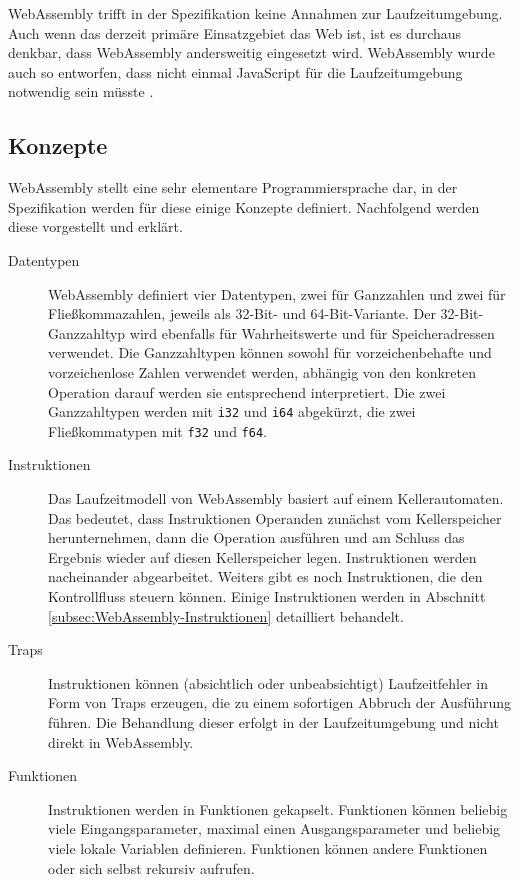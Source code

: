 WebAssembly trifft in der Spezifikation keine Annahmen zur Laufzeitumgebung. Auch wenn das derzeit primäre Einsatzgebiet das Web ist, ist es durchaus denkbar, dass WebAssembly andersweitig eingesetzt wird. WebAssembly wurde auch so entworfen, dass nicht einmal JavaScript für die Laufzeitumgebung notwendig sein müsste \cite{WebAssemblyWebsite}.

\subsection{Konzepte}
\label{subsec:WebAssembly-Konzepte}
WebAssembly stellt eine sehr elementare Programmiersprache dar, in der Spezifikation werden für diese einige Konzepte \cite{WebAssemblySpecification} definiert. Nachfolgend werden diese vorgestellt und erklärt.

\begin{description}
    \item[Datentypen] WebAssembly definiert vier Datentypen, zwei für Ganzzahlen und zwei für Fließkommazahlen, jeweils als 32-Bit- und 64-Bit-Variante. Der 32-Bit-Ganz\-zahl\-typ wird ebenfalls für Wahrheitswerte und für Speicheradressen verwendet. Die Ganzzahltypen können sowohl für vorzeichenbehafte und vorzeichenlose Zahlen verwendet werden, abhängig von den konkreten Operation darauf werden sie entsprechend interpretiert. Die zwei Ganzzahltypen werden mit \lstinline{i32} und \lstinline{i64} abgekürzt, die zwei Fließkommatypen mit \lstinline{f32} und \lstinline{f64}.
    \item[Instruktionen] Das Laufzeitmodell von WebAssembly basiert auf einem Kellerautomaten. Das bedeutet, dass Instruktionen Operanden zunächst vom Kellerspeicher herunternehmen, dann die Operation ausführen und am Schluss das Ergebnis wieder auf diesen Kellerspeicher legen. Instruktionen werden nacheinander abgearbeitet. Weiters gibt es noch Instruktionen, die den Kontrollfluss steuern können. Einige Instruktionen werden in Abschnitt \ref{subsec:WebAssembly-Instruktionen} detailliert behandelt.
    \item[Traps] Instruktionen können (absichtlich oder unbeabsichtigt) Laufzeitfehler in Form von Traps erzeugen, die zu einem sofortigen Abbruch der Ausführung führen. Die Behandlung dieser erfolgt in der Laufzeitumgebung und nicht direkt in WebAssembly.
    \item[Funktionen] Instruktionen werden in Funktionen gekapselt. Funktionen können beliebig viele Eingangsparameter, maximal einen Ausgangsparameter und beliebig viele lokale Variablen definieren. Funktionen können andere Funktionen oder sich selbst rekursiv aufrufen.

\end{description}
